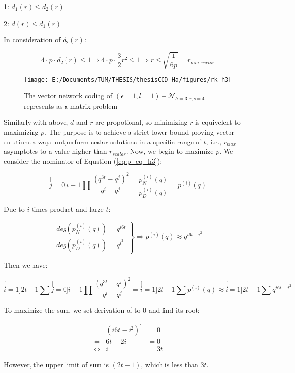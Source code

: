 1: $d_{1}(r)\leq d_{2}(r)$

2: $d(r)\leq d_{1}(r)$

In consideration of $d_{2}(r)$:

\[
4\cdot p\cdot d_{2}(r)\leq1\Rightarrow4\cdot p\cdot\frac{3}{2}r^{2}\leq1\Rightarrow r\leq\sqrt{\frac{1}{6p}}=r_{min,vector}
\]

\begin{figure}[H]
\caption{The vector network coding of $(\epsilon=1,l=1)-\mathcal{N}_{h=3,r,s=4}$
represents as a matrix problem\label{fig:rk_h3}}

\texttt{[image: E:/Documents/TUM/THESIS/thesisCOD\_Ha/figures/rk\_h3]}
\end{figure}

Similarly with above, $d$ and $r$ are propotional, so minimizing
$r$ is equivelent to maximizing $p$. The purpose is to achieve a
strict lower bound proving vector solutions always outperform scalar
solutions in a specific range of $t$, i.e., $r_{max}$asymptotes
to a value higher than $r_{scalar}$. Now, we begin to maximize $p$.
We consider the nominator of Equation (\ref{eq:p_eq_h3}):

\[
\stackrel[j=0]{i-1}{\mathop{\prod}}\frac{\left(q^{3t}-q^{j}\right)^{2}}{q^{i}-q^{j}}=\frac{p_{N}^{(i)}(q)}{p_{D}^{(i)}(q)}=p^{(i)}(q)
\]

Due to $i$-times product and large $t$:

\[
\left.\begin{array}{c}
deg\left(p_{N}^{(i)}(q)\right)=q^{i6t}\\
deg\left(p_{D}^{(i)}(q)\right)=q^{i^{2}}
\end{array}\right\} \Rightarrow p^{(i)}(q)\approx q^{i6t-i^{2}}
\]

Then we have:

\[
\stackrel[i=1]{2t-1}{\mathop{\sum}}\stackrel[j=0]{i-1}{\mathop{\prod}}\frac{\left(q^{3t}-q^{j}\right)^{2}}{q^{i}-q^{j}}=\stackrel[i=1]{2t-1}{\mathop{\sum}}p^{(i)}(q)\approx\stackrel[i=1]{2t-1}{\mathop{\sum}}q^{i6t-i^{2}}
\]

To maximize the sum, we set derivation of to 0 and find its root:

\begin{eqnarray*}
 & \left(i6t-i^{2}\right)^{'} & =0\\
\Leftrightarrow & 6t-2i & =0\\
\Leftrightarrow & i & =3t
\end{eqnarray*}

However, the upper limit of sum is $\left(2t-1\right)$, which is
less than $3t$.

